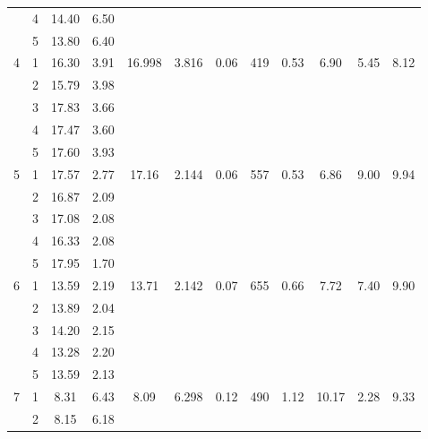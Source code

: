 \begin{table*}[]
{\begin{tabular}{|c|c|c|c|c|c|c|c|c|c|c|c|}
     & 4 & 14.40 & 6.50 &  &  &  &  &  &  &  &  \\ \cline{2-4}
     & 5 & 13.80 & 6.40 &  &  &  &  &  &  &  &  \\ \hline
    \multirow{5}{*}{4} & 1 & 16.30 & 3.91 & \multirow{5}{*}{16.998} & \multirow{5}{*}{3.816} & \multirow{5}{*}{0.06} & \multirow{5}{*}{419} & \multirow{5}{*}{0.53} & \multirow{5}{*}{6.90} & \multirow{5}{*}{5.45} & \multirow{5}{*}{8.12} \\ \cline{2-4}
     & 2 & 15.79 & 3.98 &  &  &  &  &  &  &  &  \\ \cline{2-4}
     & 3 & 17.83 & 3.66 &  &  &  &  &  &  &  &  \\ \cline{2-4}
     & 4 & 17.47 & 3.60 &  &  &  &  &  &  &  &  \\ \cline{2-4}
     & 5 & 17.60 & 3.93 &  &  &  &  &  &  &  &  \\ \hline
    \multirow{5}{*}{5} & 1 & 17.57 & 2.77 & \multirow{5}{*}{17.16} & \multirow{5}{*}{2.144} & \multirow{5}{*}{0.06} & \multirow{5}{*}{557} & \multirow{5}{*}{0.53} & \multirow{5}{*}{6.86} & \multirow{5}{*}{9.00} & \multirow{5}{*}{9.94} \\ \cline{2-4}
     & 2 & 16.87 & 2.09 &  &  &  &  &  &  &  &  \\ \cline{2-4}
     & 3 & 17.08 & 2.08 &  &  &  &  &  &  &  &  \\ \cline{2-4}
     & 4 & 16.33 & 2.08 &  &  &  &  &  &  &  &  \\ \cline{2-4}
     & 5 & 17.95 & 1.70 &  &  &  &  &  &  &  &  \\ \hline
    \multirow{5}{*}{6} & 1 & 13.59 & 2.19 & \multirow{5}{*}{13.71} & \multirow{5}{*}{2.142} & \multirow{5}{*}{0.07} & \multirow{5}{*}{655} & \multirow{5}{*}{0.66} & \multirow{5}{*}{7.72} & \multirow{5}{*}{7.40} & \multirow{5}{*}{9.90} \\ \cline{2-4}
     & 2 & 13.89 & 2.04 &  &  &  &  &  &  &  &  \\ \cline{2-4}
     & 3 & 14.20 & 2.15 &  &  &  &  &  &  &  &  \\ \cline{2-4}
     & 4 & 13.28 & 2.20 &  &  &  &  &  &  &  &  \\ \cline{2-4}
     & 5 & 13.59 & 2.13 &  &  &  &  &  &  &  &  \\ \hline
    \multirow{5}{*}{7} & 1 & 8.31 & 6.43 & \multirow{5}{*}{8.09} & \multirow{5}{*}{6.298} & \multirow{5}{*}{0.12} & \multirow{5}{*}{490} & \multirow{5}{*}{1.12} & \multirow{5}{*}{10.17} & \multirow{5}{*}{2.28} & \multirow{5}{*}{9.33} \\ \cline{2-4}
     & 2 & 8.15 & 6.18 &  &  &  &  &  &  &  &  \\ \cline{2-4}

\end{tabular}}
\end{table*}

